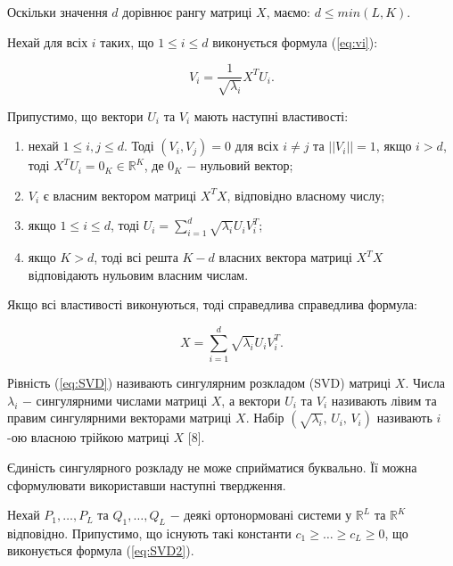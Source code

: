 Оскільки значення $d$ дорівнює рангу матриці $X$, маємо: $d \le min(L, K)$.

Нехай для всіх $i$ таких, що $1 \le i \le d$ виконується формула (\ref{eq:vi}):

\begin{equation}\label{eq:vi}
V_{i} = \frac{1}{\sqrt{\lambda_{i}}}X^{T}U_{i}.
\end{equation}

Припустимо, що вектори $U_{i}$ та $V_{i}$ мають наступні властивості:

\begin{enumerate}
	\item нехай $1 \le i, j \le d$. Тоді $(V_{i}, V_{j}) = 0$ для всіх $i \ne j$ та $||V_{i}|| = 1$, якщо\newline
\hspace*{-18mm}$i > d$, тоді $X^{T}U_{i}=0_{K} \in \mathds{R}^{K}$, де $0_{K}$ $-$ нульовий вектор;
	\item $V_{i}$ є власним вектором матриці $X^{T}X$, відповідно власному числу;
	\item якщо $1 \le i \le d$, тоді $U_{i} = \sum^d_{i=1}\sqrt{\lambda_{i}}U_{i}V_{i}^{T}$;
	\item якщо $K > d$, тоді всі решта $K - d$ власних вектора матриці $X^{T}X$\newline
\hspace*{-18mm}відповідають нульовим власним числам.

\end{enumerate}

Якщо всі властивості виконуються, тоді справедлива справедлива формула:

\begin{equation}\label{eq:SVD}
X = \sum_{i=1}^{d}\sqrt{\lambda_{i}}U_{i}V_{i}^{T}.
\end{equation}

\vspace{1.5em}

Рівність (\ref{eq:SVD}) називають сингулярним розкладом (SVD) матриці $X$. Числа $\lambda_{i}$ $-$ сингулярними числами матриці $X$, а вектори $U_{i}$ та $V_{i}$ називають лівим та правим сингулярними векторами матриці $X$. Набір $(\sqrt{\lambda_{i}}, \, U_{i}, \, V_{i})$ називають $i$-ою власною трійкою матриці $X$ [8].

Єдиність сингулярного розкладу не може сприйматися буквально. Її можна сформулювати використавши наступні твердження.

Нехай $P_{1}, \dots, P_{L}$ та $Q_{1}, \dots, Q_{L}$ $-$ деякі ортонормовані системи у $\mathds{R}^{L}$ та $\mathds{R}^{K}$ відповідно. Припустимо, що існують такі константи $c_{1} \ge \dots \ge c_{L} \ge 0$, що виконується формула (\ref{eq:SVD2}).

